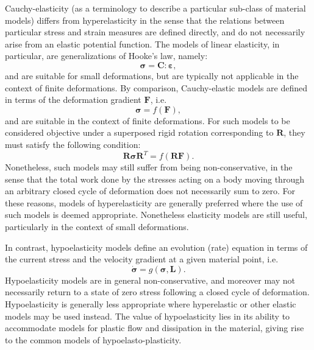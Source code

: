 Cauchy-elasticity (as a terminology to describe a particular sub-class of material models) differs from hyperelasticity in the sense that the relations between particular stress and strain measures are defined directly, and do not necessarily arise from an elastic potential function. The models of linear elasticity, in particular, are generalizations of Hooke's law, namely:
\begin{equation}
  \boldsymbol{\sigma} = \mathbf{C} \colon \boldsymbol{\varepsilon},
\end{equation}
and are suitable for small deformations, but are typically not applicable in the context of finite deformations. By comparison, Cauchy-elastic models are defined in terms of the deformation gradient $\mathbf{F}$, i.e.
\begin{equation}
  \boldsymbol{\sigma} = f (\mathbf{F}),
\end{equation}
and are suitable in the context of finite deformations. For such models to be considered objective under a superposed rigid rotation corresponding to $\mathbf{R}$, they must satisfy the following condition:
\begin{equation}
  \mathbf{R} \boldsymbol{\sigma} \mathbf{R}^T = f (\mathbf{R} \mathbf{F}).
\end{equation}
Nonetheless, such models may still suffer from being non-conservative, in the sense that the total work done by the stresses acting on a body moving through an arbitrary closed cycle of deformation does not necessarily sum to zero. For these reasons, models of hyperelasticity are generally preferred where the use of such models is deemed appropriate. Nonetheless elasticity models are still useful, particularly in the context of small deformations.

In contrast, hypoelasticity models define an evolution (rate) equation in terms of the current stress and the velocity gradient at a given material point, i.e.
\begin{equation}
  \dot{\boldsymbol{\sigma}} = g(\boldsymbol{\sigma}, \mathbf{L}).
\end{equation}
Hypoelasticity models are in general non-conservative, and moreover may not necessarily return to a state of zero stress following a closed cycle of deformation. Hypoelasticity is generally less appropriate where hyperelastic or other elastic models may be used instead. The value of hypoelasticity lies in its ability to accommodate models for plastic flow and dissipation in the material, giving rise to the common models of hypoelasto-plasticity.

